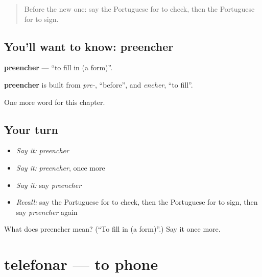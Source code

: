 \label{lesson:PT-C232-preencher}



\begin{quote}
Before the new one: say the Portuguese for to check, then the Portuguese for to sign.
\end{quote}

\subsection*{You'll want to know: preencher}
\textbf{preencher} — \textquotedblleft{}to fill in (a form)\textquotedblright{}.

\begin{cousinweb}
\textbf{preencher} is built from \emph{pre-}, \textquotedblleft{}before\textquotedblright{}, and \emph{encher}, \textquotedblleft{}to fill\textquotedblright{}.
\end{cousinweb}

\begin{grammarlens}[title={What you've built}]
One more word for this chapter.
\end{grammarlens}

\subsection*{Your turn}
\begin{itemize}
\raggedright
  \item \emph{Say it:} \emph{preencher}
  \item \emph{Say it:} \emph{preencher}, once more
  \item \emph{Say it:} say \emph{preencher}
  \item \emph{Recall:} say the Portuguese for to check, then the Portuguese for to sign, then say \emph{preencher} again
\end{itemize}

\begin{tcolorbox}[breakable,colback=teal!4,colframe=teal!35!black,title={Before you move on}]
What does preencher mean? (\textquotedblleft{}To fill in (a form)\textquotedblright{}.) Say it once more.
\end{tcolorbox}
\section[telefonar]{telefonar — to phone}

\label{lesson:PT-C232-telefonar}



